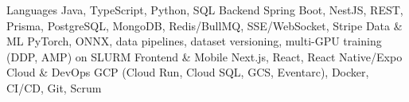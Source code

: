 \begin{cvskills}
  \cvskill
    {Languages}
    {Java, TypeScript, Python, SQL}
  \cvskill
    {Backend}
    {Spring Boot, NestJS, REST, Prisma, PostgreSQL, MongoDB, Redis/BullMQ, SSE/WebSocket, Stripe}
  \cvskill
    {Data \& ML}
    {PyTorch, ONNX, data pipelines, dataset versioning, multi-GPU training (DDP, AMP) on SLURM}
  \cvskill
    {Frontend \& Mobile}
    {Next.js, React, React Native/Expo}
  \cvskill
    {Cloud \& DevOps}
    {GCP (Cloud Run, Cloud SQL, GCS, Eventarc), Docker, CI/CD, Git, Scrum}
\end{cvskills}
